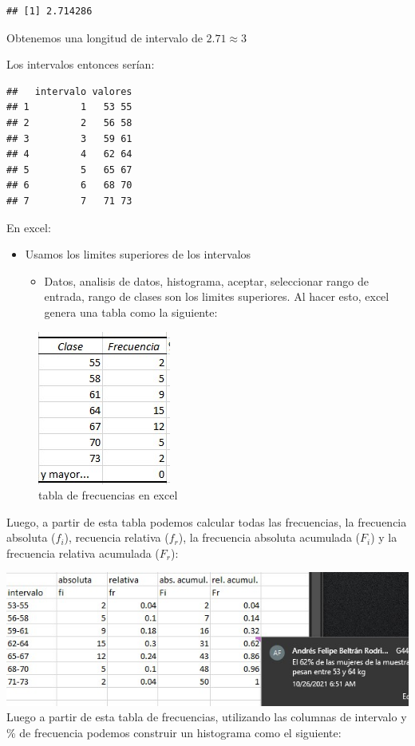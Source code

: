 \documentclass[twocolumn]{article}
\providecommand{\tightlist}{%
  \setlength{\itemsep}{0pt}\setlength{\parskip}{0pt}}
\begin{document}
\begin{verbatim}
## [1] 2.714286
\end{verbatim}

Obtenemos una longitud de intervalo de \(2.71 \approx 3\)

Los intervalos entonces serían:

\begin{verbatim}
##   intervalo valores
## 1         1   53 55
## 2         2   56 58
## 3         3   59 61
## 4         4   62 64
## 5         5   65 67
## 6         6   68 70
## 7         7   71 73
\end{verbatim}

En excel:

\begin{itemize}
\tightlist
\item
  Usamos los limites superiores de los intervalos

  \begin{itemize}
  \tightlist
  \item
    Datos, analisis de datos, histograma, aceptar, seleccionar rango de
    entrada, rango de clases son los limites superiores. Al hacer esto,
    excel genera una tabla como la siguiente:
  \end{itemize}
\end{itemize}

\begin{figure}
\centering
\includegraphics{./img/frecuenciasExcel.jpg}
\caption{tabla de frecuencias en excel}
\end{figure}

Luego, a partir de esta tabla podemos calcular todas las frecuencias, la
frecuencia absoluta (\(f_i\)), recuencia relativa (\(f_r\)), la
frecuencia absoluta acumulada (\(F_i\)) y la frecuencia relativa
acumulada (\(F_r\)):

\includegraphics{./img/tablaDeFrecuencias.jpg} Luego a partir de esta
tabla de frecuencias, utilizando las columnas de intervalo y \% de
frecuencia podemos construir un histograma como el siguiente:
\end{document}

